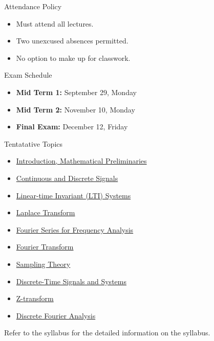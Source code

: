 \documentclass[aspectratio=169,xcolor=dvipsnames,svgnames,x11names,fleqn]{beamer}
\begin{document}
\begin{frame}{Attendance Policy}

\begin{itemize}
\item Must attend all lectures.
\item Two unexcused absences permitted.
\item No option to make up for classwork.
\end{itemize}

\end{frame}

\begin{frame}{Exam Schedule}
\begin{itemize}
\item \textbf{Mid Term 1:}  September 29, Monday
\item \textbf{Mid Term 2:}  November 10, Monday
\item \textbf{Final Exam:}  December 12, Friday
\end{itemize}
\end{frame}

\begin{frame}{Tentatative Topics}
\small
\begin{itemize}
	\item \color{DodgerBlue4} \underline{Introduction, Mathematical Preliminaries}
 
    \item \color{Firebrick3} \underline{Continuous and Discrete Signals} 
    
    \item  \color{DodgerBlue4} \underline{Linear-time Invariant (LTI) Systems}
    
    \item   \color{Firebrick3} \underline{Laplace Transform}
    
    \item  \color{DodgerBlue4} \underline{Fourier Series for Frequency Analysis} 


    \item  \color{Firebrick3} \underline{Fourier Transform} 
    
    \item \color{DodgerBlue4} \underline{Sampling Theory} 
    \item   \color{Firebrick3}  \underline{Discrete-Time Signals and Systems}
    
    \item  \color{DodgerBlue4} \underline{Z-transform}
    \item  \color{Firebrick3} \underline{Discrete Fourier Analysis} 
   
\end{itemize}
\begin{center}
    Refer to the syllabus for the detailed information on the syllabus.
\end{center}
\end{frame}
\end{document}

